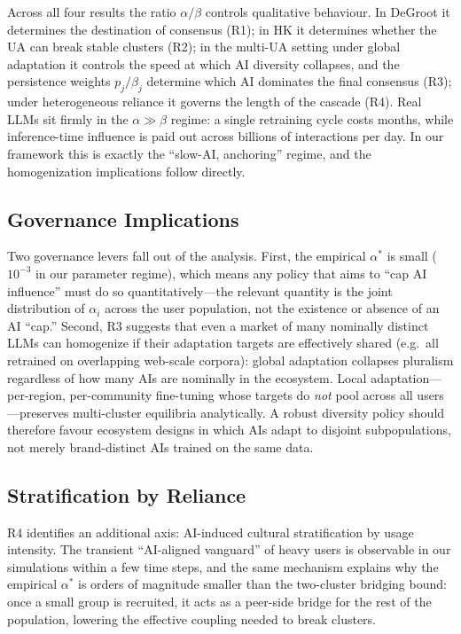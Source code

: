 \documentclass{article}
\theoremstyle{plain}
\theoremstyle{definition}
\theoremstyle{remark}
\begin{document}
Across all four results the ratio $\alpha/\beta$ controls
qualitative behaviour.  In DeGroot it determines the destination of
consensus (R1); in HK it determines whether the UA can break stable
clusters (R2); in the multi-UA setting under global adaptation it
controls the speed at which AI diversity collapses, and the
persistence weights $p_j/\beta_j$ determine which AI dominates the
final consensus (R3); under heterogeneous reliance it governs the
length of the cascade (R4).  Real LLMs sit firmly in the
$\alpha\gg\beta$ regime: a single retraining cycle costs months,
while inference-time influence is paid out across billions of
interactions per day.  In our framework this is exactly the
``slow-AI, anchoring'' regime, and the homogenization implications
follow directly.

\subsection{Governance Implications}

Two governance levers fall out of the analysis.  First, the
empirical $\alpha^*$ is small ($10^{-3}$ in our parameter regime),
which means any policy that aims to ``cap AI influence'' must do so
quantitatively---the relevant quantity is the joint distribution of
$\alpha_i$ across the user population, not the existence or absence
of an AI ``cap.''  Second, R3 suggests that even a market of many
nominally distinct LLMs can homogenize if their adaptation targets
are effectively shared (e.g.\ all retrained on overlapping web-scale
corpora): global adaptation collapses pluralism regardless of how
many AIs are nominally in the ecosystem.  Local
adaptation---per-region, per-community fine-tuning whose targets do
\emph{not} pool across all users---preserves multi-cluster equilibria
analytically.  A robust diversity policy should therefore favour
ecosystem designs in which AIs adapt to disjoint subpopulations, not
merely brand-distinct AIs trained on the same data.

\subsection{Stratification by Reliance}

R4 identifies an additional axis: AI-induced cultural stratification
by usage intensity.  The transient ``AI-aligned vanguard'' of heavy
users is observable in our simulations within a few time steps, and
the same mechanism explains why the empirical $\alpha^*$ is orders of
magnitude smaller than the two-cluster bridging bound: once a small
group is recruited, it acts as a peer-side bridge for the rest of the
population, lowering the effective coupling needed to break clusters.
\end{document}
